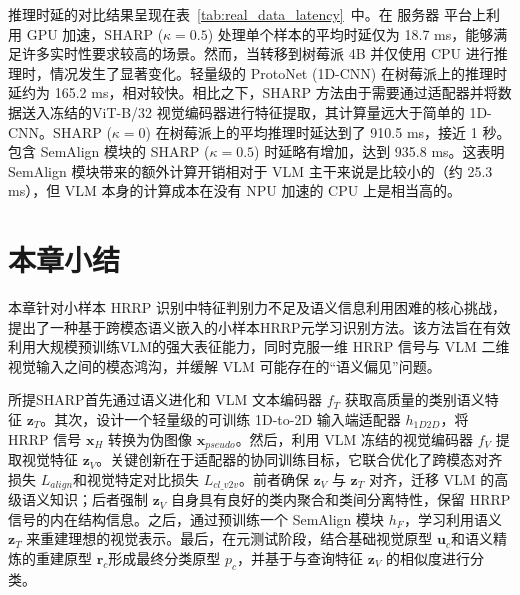 \begin{table}[h!]
\centering
\caption{不同方法与平台在实测 HRRP 数据上的平均单样本推理时延对比}
\label{tab:real_data_latency}
\end{table}
\captionsetup{skip=5pt}

推理时延的对比结果呈现在表~\ref{tab:real_data_latency}~中。在 服务器 平台上利用 GPU 加速，SHARP ($\kappa=0.5$) 处理单个样本的平均时延仅为 18.7 ms，能够满足许多实时性要求较高的场景。然而，当转移到树莓派 4B 并仅使用 CPU 进行推理时，情况发生了显著变化。轻量级的 ProtoNet (1D-CNN) 在树莓派上的推理时延约为 165.2 ms，相对较快。相比之下，SHARP 方法由于需要通过适配器并将数据送入冻结的ViT-B/32 视觉编码器进行特征提取，其计算量远大于简单的 1D-CNN。SHARP ($\kappa=0$) 在树莓派上的平均推理时延达到了 910.5 ms，接近 1 秒。包含 SemAlign 模块的 SHARP ($\kappa=0.5$) 时延略有增加，达到 935.8 ms。这表明 SemAlign 模块带来的额外计算开销相对于 VLM 主干来说是比较小的（约 25.3 ms），但 VLM 本身的计算成本在没有 NPU 加速的 CPU 上是相当高的。

\section{本章小结}
\label{sec:semantic_summary}

本章针对小样本 HRRP 识别中特征判别力不足及语义信息利用困难的核心挑战，提出了一种基于跨模态语义嵌入的小样本HRRP元学习识别方法。该方法旨在有效利用大规模预训练VLM的强大表征能力，同时克服一维 HRRP 信号与 VLM 二维视觉输入之间的模态鸿沟，并缓解 VLM 可能存在的“语义偏见”问题。

所提SHARP首先通过语义进化和 VLM 文本编码器 $f_T$ 获取高质量的类别语义特征 $\mathbf{z}_T$。其次，设计一个轻量级的可训练 1D-to-2D 输入端适配器 $h_{1D2D}$，将 HRRP 信号 $\mathbf{x}_H$ 转换为伪图像 $\mathbf{x}_{pseudo}$。然后，利用 VLM 冻结的视觉编码器 $f_V$ 提取视觉特征 $\mathbf{z}_V$。关键创新在于适配器的协同训练目标，它联合优化了跨模态对齐损失 $L_{align}$和视觉特定对比损失 $L_{cl\_v2v}$。前者确保 $\mathbf{z}_V$ 与 $\mathbf{z}_T$ 对齐，迁移 VLM 的高级语义知识；后者强制 $\mathbf{z}_V$ 自身具有良好的类内聚合和类间分离特性，保留 HRRP 信号的内在结构信息。之后，通过预训练一个 SemAlign 模块 $h_F$，学习利用语义 $\mathbf{z}_T$ 来重建理想的视觉表示。最后，在元测试阶段，结合基础视觉原型 $\mathbf{u}_c$和语义精炼的重建原型 $\mathbf{r}_c$形成最终分类原型 $p_c$，并基于与查询特征 $\mathbf{z}_V$ 的相似度进行分类。

